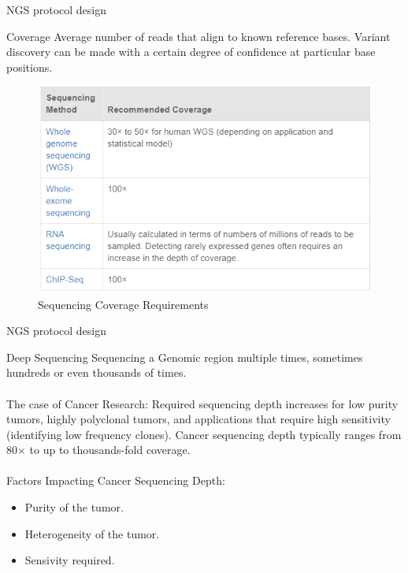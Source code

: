 \documentclass{if-beamer}
\begin{document}
\begin{frame}{NGS protocol design}
\begin{exampleblock}{Coverage}
Average number of reads that align to known reference bases. Variant discovery can be made with a certain degree of confidence at particular base positions.
\end{exampleblock}
\begin{figure}
\centering
\includegraphics[scale=0.5]{sequencing_coverage_requirements.PNG}
\caption{Sequencing Coverage Requirements}
\end{figure}
\end{frame}
\begin{frame}{NGS protocol design}
\begin{exampleblock}{Deep Sequencing}
Sequencing a Genomic region multiple times, sometimes hundreds or even thousands of times.
\\~\\
The case of Cancer Research: Required sequencing depth increases for low purity tumors, highly polyclonal tumors, and applications that require high sensitivity (identifying low frequency clones). Cancer sequencing depth typically ranges from 80× to up to thousands-fold coverage.
\\~\\
Factors Impacting Cancer Sequencing Depth:
\begin{itemize}
    \item Purity of the tumor.
    \item Heterogeneity of the tumor.
    \item Sensivity required.
\end{itemize}
\end{exampleblock}
\end{frame}
\end{document}
